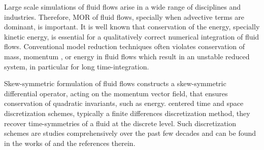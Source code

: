 Large scale simulations of fluid flows arise in a wide range of disciplines and industries. Therefore, MOR of fluid flows, specially when advective terms are dominant, is important. It is well known that conservation of the energy, specially kinetic energy, is essential for a qualitatively correct numerical integration of fluid flows. Conventional model reduction techniques often violates conservation of mass, momentum \cite{carlberg2018conservative}, or energy in fluid flows which result in an unstable reduced system, in particular for long time-integration. 


Skew-symmetric formulation of fluid flows constructs a skew-symmetric differential operator, acting on the momentum vector field, that ensures conservation of quadratic invariants, such as energy.  centered time and space discretization schemes, typically a finite differences discretization method, they recover time-symmetries of a fluid at the discrete level. Such discretization schemes are studies comprehensively over the past few decades and can be found in the works of \cite{morinishi2010skew,morinishi1998fully,desjardins2008high,tadmor1984skew,reiss2014conservative} and the references therein.

